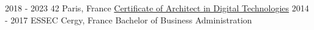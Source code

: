 \documentclass[10pt]{developercv} %
\begin{document}

%



\begin{entrylist}
	\entry
		{2018 - 2023}
		{42}
		{Paris, France}
		{\href{https://cv.42.fr/abarthel}{Certificate of Architect in Digital Technologies}}
	\entry
		{2014 - 2017}
		{ESSEC}
		{Cergy, France}
		{Bachelor of Business Administration}
\end{entrylist}


%
%
%
%
%

\end{document}
